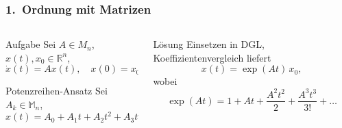 \begin{frame}[t]
  \setlength{\abovedisplayskip}{5pt}
  \setlength{\belowdisplayskip}{5pt}
  \frametitle{1.~Ordnung mit Matrizen}
  \vspace{-20pt}
  \begin{columns}[t,onlytextwidth]
    \begin{column}{0.48\textwidth}
      \begin{block}{Aufgabe}
        Sei $A \in M_n$, $x(t), x_0 \in \mathbb R^n$,
        \[
        \dot x(t) = Ax(t),
        \quad
        x(0) = x_0
        \]
      \end{block}
      \begin{block}{Potenzreihen-Ansatz}
        Sei $A_k \in \mathbb M_n$,
        \[
        x(t) = A_0 + A_1t + A_2t^2 + A_3t^3 \ldots
        \]
      \end{block}
    \end{column}
    \begin{column}{0.48\textwidth}
      \begin{block}{Lösung}
        Einsetzen in DGL, Koeffizientenvergleich liefert
        \[ x(t) = \exp(At) \, x_0, \]
        wobei
        \[
        \exp(At)
        = 1 + At + \frac{A^2t^2}{2} + \frac{A^3t^3}{3!} + \ldots
        \]
      \end{block}
    \end{column}
  \end{columns}
\end{frame}

\egroup
